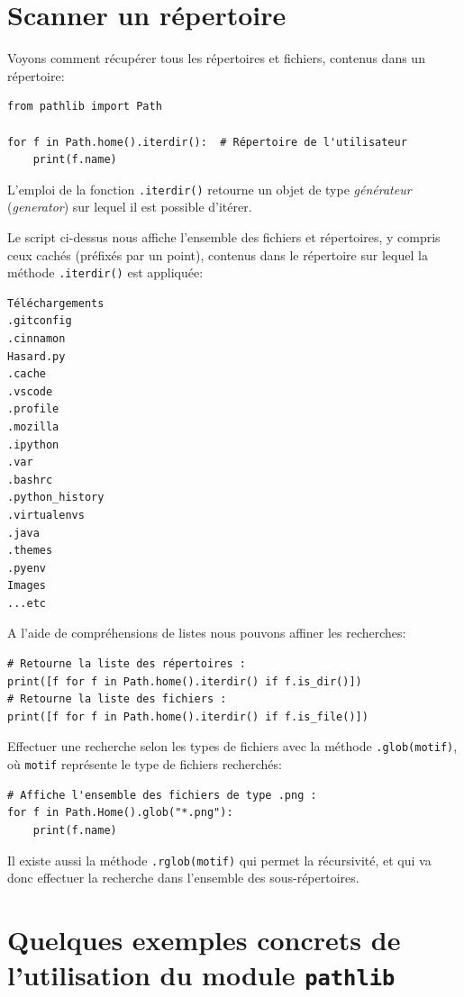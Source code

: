 \documentclass[a4paper,11pt]{book}
\begin{document}
\section{Scanner un répertoire}
Voyons comment récupérer tous les répertoires et fichiers, contenus dans un répertoire:
\begin{lstlisting}[caption=La méthode \texttt{.iterdir()}]
from pathlib import Path

for f in Path.home().iterdir():  # Répertoire de l'utilisateur
    print(f.name)
\end{lstlisting}
\medskip

L'emploi de la fonction \texttt{.iterdir()} retourne un objet de type \textit{générateur} (\textit{generator}) sur lequel il est possible d'itérer.
\medskip

Le script ci-dessus nous affiche l'ensemble des fichiers et répertoires, y compris ceux cachés (préfixés par un point), contenus dans le répertoire sur lequel la méthode \texttt{.iterdir()} est appliquée:
\begin{verbatim}
Téléchargements
.gitconfig
.cinnamon
Hasard.py
.cache
.vscode
.profile
.mozilla
.ipython
.var
.bashrc
.python_history
.virtualenvs
.java
.themes
.pyenv
Images
...etc
\end{verbatim}
\medskip

A l'aide de compréhensions de listes nous pouvons affiner les recherches:
\begin{lstlisting}[caption=La méthode \texttt{.iterdir()} avec des compréhensions de liste]
# Retourne la liste des répertoires :
print([f for f in Path.home().iterdir() if f.is_dir()])  
# Retourne la liste des fichiers :
print([f for f in Path.home().iterdir() if f.is_file()])  
\end{lstlisting}
\medskip

Effectuer une recherche selon les types de fichiers avec la méthode \texttt{.glob(motif)}, où \texttt{motif} représente le type de fichiers recherchés:
\begin{lstlisting}[caption=La méthode \texttt{.glob(motif)}]
# Affiche l'ensemble des fichiers de type .png :
for f in Path.Home().glob("*.png"):
    print(f.name)
\end{lstlisting}
\medskip

Il existe aussi la méthode \texttt{.rglob(motif)} qui permet la récursivité, et qui va donc effectuer la recherche dans l'ensemble des sous-répertoires.
\medskip

\section{Quelques exemples concrets de l'utilisation du module \texttt{pathlib}}
\end{document}
